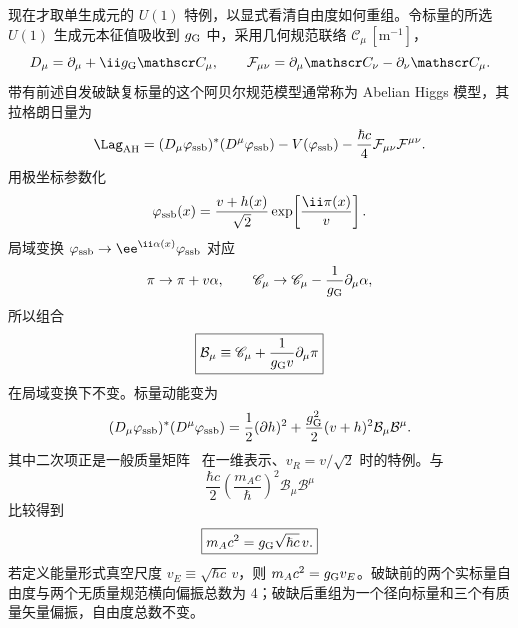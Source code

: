 现在才取单生成元的 $U(1)$ 特例，以显式看清自由度如何重组。令标量的所选 $U(1)$ 生成元本征值吸收到 $g_{\rm G}$ 中，采用几何规范联络 $\mathscr C_\mu\,[\mathrm{m^{-1}}]$，
\begin{equation*}
 D_\mu=\partial_\mu+\ii g_{\rm G}\mathscr C_\mu,
 \qquad
 \mathcal F_{\mu\nu}
 =\partial_\mu\mathscr C_\nu-\partial_\nu\mathscr C_\mu.
\end{equation*}
带有前述自发破缺复标量的这个阿贝尔规范模型通常称为 Abelian Higgs 模型，其拉格朗日量为
\begin{equation}
 \Lag_{\rm AH}
 =(D_\mu\varphi_{\rm ssb})^*(D^\mu\varphi_{\rm ssb})-V(\varphi_{\rm ssb})
 -\frac{\hbar c}{4}\mathcal F_{\mu\nu}\mathcal F^{\mu\nu}.
 \label{eq:abelian-higgs-lag-dp11}
\end{equation}
用极坐标参数化
\begin{equation}
 \varphi_{\rm ssb}(x)=\frac{v+h(x)}{\sqrt2}
 \exp\!\left[\frac{\ii\pi(x)}{v}\right].
 \label{eq:abelian-higgs-polar-dp11}
\end{equation}
局域变换 $\varphi_{\rm ssb}\to \ee^{\ii\alpha(x)}\varphi_{\rm ssb}$ 对应
\begin{equation*}
 \pi\to\pi+v\alpha,
 \qquad
 \mathscr C_\mu\to\mathscr C_\mu-\frac1{g_{\rm G}}\partial_\mu\alpha,
\end{equation*}
所以组合
\begin{equation}
 \boxed{
 \mathcal B_\mu
 \equiv\mathscr C_\mu+\frac1{g_{\rm G}v}\partial_\mu\pi}
 \label{eq:gauge-invariant-massive-vector-dp11}
\end{equation}
在局域变换下不变。标量动能变为
\begin{equation}
 (D_\mu\varphi_{\rm ssb})^*(D^\mu\varphi_{\rm ssb})
 =\frac12(\partial h)^2
 +\frac{g_{\rm G}^2}{2}(v+h)^2\mathcal B_\mu\mathcal B^\mu.
 \label{eq:abelian-higgs-kinetic-expanded-dp11}
\end{equation}
其中二次项正是一般质量矩阵~ 在一维表示、$v_R=v/\sqrt2$ 时的特例。与
\[
 \frac{\hbar c}{2}
 \left(\frac{m_Ac}{\hbar}\right)^2
 \mathcal B_\mu\mathcal B^\mu
\]
比较得到
\begin{equation}
 \boxed{m_Ac^2=g_{\rm G}\sqrt{\hbar c}\,v.}
 \label{eq:abelian-higgs-vector-mass-dp11}
\end{equation}
若定义能量形式真空尺度 $v_E\equiv\sqrt{\hbar c}\,v$，则 $m_Ac^2=g_{\rm G}v_E$。破缺前的两个实标量自由度与两个无质量规范横向偏振总数为 4；破缺后重组为一个径向标量和三个有质量矢量偏振，自由度总数不变。

